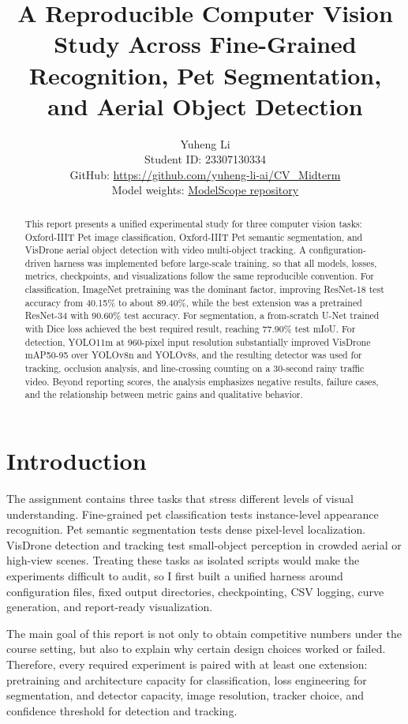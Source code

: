 \documentclass[10pt,twocolumn]{article}
\title{\vspace{-1.0em}A Reproducible Computer Vision Study Across Fine-Grained Recognition, Pet Segmentation, and Aerial Object Detection}
\author{Yuheng Li\\Student ID: 23307130334\\GitHub: \url{https://github.com/yuheng-li-ai/CV_Midterm}\\Model weights: \href{https://www.modelscope.cn/models/yuhengli/cv-hw2-final-model}{ModelScope repository}}
\date{}
\begin{document}
\maketitle

\begin{abstract}
This report presents a unified experimental study for three computer vision tasks: Oxford-IIIT Pet image classification, Oxford-IIIT Pet semantic segmentation, and VisDrone aerial object detection with video multi-object tracking. A configuration-driven harness was implemented before large-scale training, so that all models, losses, metrics, checkpoints, and visualizations follow the same reproducible convention. For classification, ImageNet pretraining was the dominant factor, improving ResNet-18 test accuracy from 40.15\% to about 89.40\%, while the best extension was a pretrained ResNet-34 with 90.60\% test accuracy. For segmentation, a from-scratch U-Net trained with Dice loss achieved the best required result, reaching 77.90\% test mIoU. For detection, YOLO11m at 960-pixel input resolution substantially improved VisDrone mAP50-95 over YOLOv8n and YOLOv8s, and the resulting detector was used for tracking, occlusion analysis, and line-crossing counting on a 30-second rainy traffic video. Beyond reporting scores, the analysis emphasizes negative results, failure cases, and the relationship between metric gains and qualitative behavior.
\end{abstract}

\section{Introduction}

The assignment contains three tasks that stress different levels of visual understanding. Fine-grained pet classification tests instance-level appearance recognition. Pet semantic segmentation tests dense pixel-level localization. VisDrone detection and tracking test small-object perception in crowded aerial or high-view scenes. Treating these tasks as isolated scripts would make the experiments difficult to audit, so I first built a unified harness around configuration files, fixed output directories, checkpointing, CSV logging, curve generation, and report-ready visualization.

The main goal of this report is not only to obtain competitive numbers under the course setting, but also to explain why certain design choices worked or failed. Therefore, every required experiment is paired with at least one extension: pretraining and architecture capacity for classification, loss engineering for segmentation, and detector capacity, image resolution, tracker choice, and confidence threshold for detection and tracking.
\end{document}
